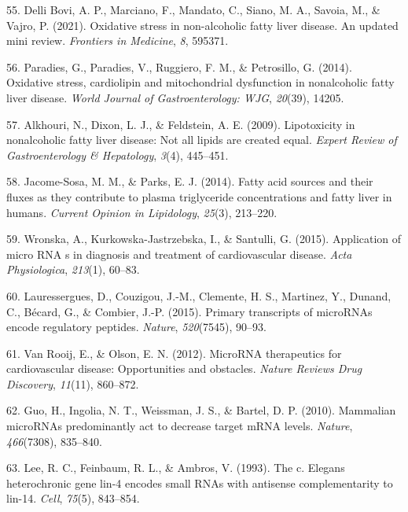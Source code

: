 \documentclass[
  11pt,
  letterpaper,
]{book}
\newlength{\cslhangindent}
\newenvironment{CSLReferences}[2] %
 {\begin{list}{}{%
  \setlength{\itemindent}{0pt}
  \setlength{\leftmargin}{0pt}
  \setlength{\parsep}{0pt}
  \ifodd #1
   \setlength{\leftmargin}{\cslhangindent}
   \setlength{\itemindent}{-1\cslhangindent}
  \fi
  \setlength{\itemsep}{#2\baselineskip}}}
 {\end{list}}
\begin{document}
\begin{CSLReferences}{1}{0}
55. Delli Bovi, A. P., Marciano, F., Mandato, C., Siano, M. A., Savoia,
M., \& Vajro, P. (2021). Oxidative stress in non-alcoholic fatty liver
disease. An updated mini review. \emph{Frontiers in Medicine}, \emph{8},
595371.

56. Paradies, G., Paradies, V., Ruggiero, F. M., \& Petrosillo, G.
(2014). Oxidative stress, cardiolipin and mitochondrial dysfunction in
nonalcoholic fatty liver disease. \emph{World Journal of
Gastroenterology: WJG}, \emph{20}(39), 14205.

57. Alkhouri, N., Dixon, L. J., \& Feldstein, A. E. (2009). Lipotoxicity
in nonalcoholic fatty liver disease: Not all lipids are created equal.
\emph{Expert Review of Gastroenterology \& Hepatology}, \emph{3}(4),
445--451.

58. Jacome-Sosa, M. M., \& Parks, E. J. (2014). Fatty acid sources and
their fluxes as they contribute to plasma triglyceride concentrations
and fatty liver in humans. \emph{Current Opinion in Lipidology},
\emph{25}(3), 213--220.

59. Wronska, A., Kurkowska-Jastrzebska, I., \& Santulli, G. (2015).
Application of micro RNA s in diagnosis and treatment of cardiovascular
disease. \emph{Acta Physiologica}, \emph{213}(1), 60--83.

60. Lauressergues, D., Couzigou, J.-M., Clemente, H. S., Martinez, Y.,
Dunand, C., Bécard, G., \& Combier, J.-P. (2015). Primary transcripts of
microRNAs encode regulatory peptides. \emph{Nature}, \emph{520}(7545),
90--93.

61. Van Rooij, E., \& Olson, E. N. (2012). MicroRNA therapeutics for
cardiovascular disease: Opportunities and obstacles. \emph{Nature
Reviews Drug Discovery}, \emph{11}(11), 860--872.

62. Guo, H., Ingolia, N. T., Weissman, J. S., \& Bartel, D. P. (2010).
Mammalian microRNAs predominantly act to decrease target mRNA levels.
\emph{Nature}, \emph{466}(7308), 835--840.

63. Lee, R. C., Feinbaum, R. L., \& Ambros, V. (1993). The c. Elegans
heterochronic gene lin-4 encodes small RNAs with antisense
complementarity to lin-14. \emph{Cell}, \emph{75}(5), 843--854.


\end{CSLReferences}
\end{document}
